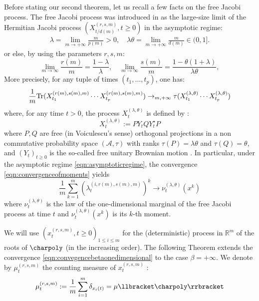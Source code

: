 \documentclass[12pt,reqno]{amsart}
\begin{document}
Before stating our second theorem, let us recall a few facts on the free Jacobi process.
The free Jacobi process was introduced in \cite{MR2384475} as the large-size limit of the Hermitian Jacobi process $(X^{(r,s,m)}_{t/d(m)}, t \geq 0)$ in the asymptotic regime:
\begin{align}
	\label{eqn:asymptoticregime}
	\lambda = \lim_{m \rightarrow +\infty} \frac{m}{p(m)} > 0, \quad \lambda\theta = \lim_{m \rightarrow +\infty} \frac{m}{d(m)} \in (0,1].
\end{align}
or else, by using the parameters $r,s,m$:
$$
\lim_{m \rightarrow \infty} \frac{r(m)}{m} = \frac{1-\lambda}{\lambda},\quad 
\lim_{m \rightarrow \infty} \frac{s(m)}{m} = \frac{1-\theta(1+\lambda)}{\lambda \theta},
$$
More precisely, for any tuple of times $(t_1,\ldots,t_p)$, one has:
\begin{equation}
\label{eqn:convergenceofmoments}
 \frac{1}{m}{\rm Tr}(X^{(r(m),s(m),m)}_{t_1}\cdots X^{(r(m),s(m),m)}_{t_p}) \to_{m,+\infty} \tau(X_{t_1}^{(\lambda,\theta)} \cdots X_{t_p}^{(\lambda,\theta)})   
\end{equation}
where, for any time $t > 0$, the process $X_t^{(\lambda,\theta)}$ is defined by :
\begin{equation*}
X_t^{(\lambda,\theta)}:= PY_tQY_t^{\star}P    
\end{equation*}
where $P,Q$ are free (in Voiculescu's sense) orthogonal projections in a non commutative probability space $(\mathcal{A}, \tau)$ with ranks $\tau(P) = \lambda \theta$ and $\tau(Q) = \theta$, and $(Y_t)_{t \geq 0}$ is the so-called free unitary Brownian motion \cite{MR1430721}. In particular, under the asymptotic regime \eqref{eqn:asymptoticregime}, the convergence \eqref{eqn:convergenceofmoments} yields 
\begin{equation}
\label{eqn:convegencebetaonedimensional}
\frac{1}{m}\sum_{k=1}^m (\lambda_t^{(i,r(m),s(m),m)})^k \to \nu^{(\lambda, \theta)}_t(x^k)
\end{equation}
where $\nu_t^{(\lambda,\theta)}$ is the law of the one-dimensional marginal of the free Jacobi process at time $t$ and  $\nu^{(\lambda, \theta)}_t(x^k)$ is its $k$-th moment.

We will use $(x^{(r,s,m)}_t, t \geq 0)_{1 \leq i \leq m}$ for the (deterministic) process in $\mathbb{R}^m$ of the roots of $\charpoly$ (in the increasing order). The following Theorem extends the convergence \eqref{eqn:convegencebetaonedimensional} to the case $\beta = +\infty$. 
We denote by $\mu_t^{(r,s,m)}$ the counting measure of $x^{(r,s,m)}_t$ :
\begin{equation*}
	\mu_t^{(r,s,m)}:=\frac{1}{m}\sum_{i=1}^m\delta_{x_i(t)} = \mu\llbracket \charpoly \rrbracket
\end{equation*}
\end{document}
